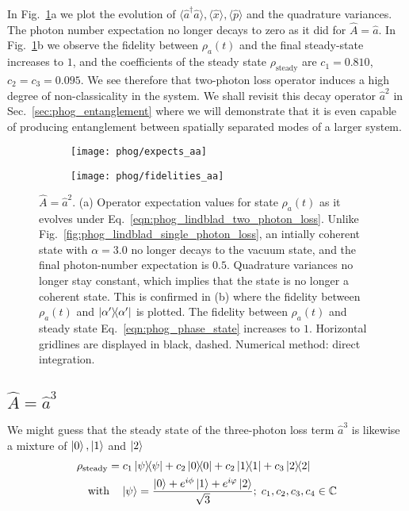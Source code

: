 In Fig.~\ref{fig:phog_lindblad_two_photon_loss}a we plot the evolution of $\langle \hat{a}^\dagger \hat{a}\rangle, \langle \hat{x}\rangle, \langle \hat{p}\rangle$ and the quadrature variances. The photon number expectation no longer decays to zero as it did for $\hat{A}=\hat{a}$. %
 In Fig.~\ref{fig:phog_lindblad_two_photon_loss}b we observe the fidelity between $\rho_a\left(t\right)$ and the final steady-state increases to $1$, and the coefficients of the steady state $\rho_{\text{steady}}$ are $c_1 = 0.810$, $c_2 = c_3 = 0.095$. We see therefore that two-photon loss operator induces a high degree of non-classicality in the system. We shall revisit this decay operator $\hat{a}^2$ in Sec.~\ref{sec:phog_entanglement} where we will demonstrate that it is even capable of producing entanglement between spatially separated modes of a larger system.


\begin{figure}[htp]
\captionsetup{width=0.8\linewidth}
\centering
	\begin{subfigure}{0.7\linewidth}
	\centering
	\caption{}
	\texttt{[image: phog/expects\_aa]}
	\end{subfigure}
	\begin{subfigure}{0.7\linewidth}
	\centering
	\caption{}
	\texttt{[image: phog/fidelities\_aa]}
	\end{subfigure}
\caption{\label{fig:phog_lindblad_two_photon_loss}$\hat{A} = \hat{a}^2$. (a) Operator expectation values for state $\rho_a\left(t\right)$ as it evolves under Eq.~\ref{eqn:phog_lindblad_two_photon_loss}. Unlike Fig.~\ref{fig:phog_lindblad_single_photon_loss}, an intially coherent state with $\alpha=3.0$ no longer decays to the vacuum state, and the final photon-number expectation is $0.5$. Quadrature variances no longer stay constant, which implies that the state is no longer a coherent state. This is confirmed in (b) where the fidelity between $\rho_a\left(t\right)$ and $\dyad{\alpha^\prime}$ is plotted. The fidelity between $\rho_a\left(t\right)$ and steady state Eq.~\ref{eqn:phog_phase_state} increases to $1$. Horizontal gridlines are displayed in black, dashed. Numerical method: direct integration.} %
\end{figure}

\iffalse
\clearpage
\subsection{$\hat{A} = \hat{a}^3$}\label{sec:A_aaa}
We might guess that the steady state of the three-photon loss term $\hat{a}^3$ is likewise a mixture of $\ket{0}, \ket{1}$ and $\ket{2}$
\begin{align}\label{eqn:phog_three_photon_loss_ss}
&\rho_{\text{steady}} = c_1 \dyad{\psi} + c_2 \dyad{0} + c_2 \dyad{1} + c_3 \dyad{2} \notag \\
%
&\qq{with} \ket{\psi} = \frac{\ket{0} + e^{i \phi}\ket{1} + e^{i \varphi}\ket{2}}{\sqrt{3}}; \; c_1, c_2, c_3, c_4 \in \mathbb{C}
\end{align}


